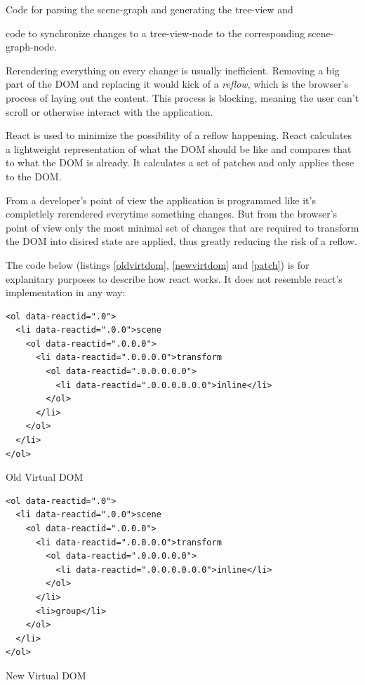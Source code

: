 \begin{enumerate*}
  \item Code for parsing the scene-graph and generating the tree-view and
  \item code to synchronize changes to a tree-view-node to the corresponding scene-graph-node.
\end{enumerate*}

Rerendering everything on every change is usually inefficient. Removing a big part
of the DOM and replacing it would kick of a \emph{reflow}, which is the browser's
process of laying out the content. This process is blocking, meaning the user can't
scroll or otherwise interact with the application. \cite{reflow}

React is used to minimize the possibility of a reflow happening. React
calculates a lightweight representation of what the DOM should be like and
compares that to what the DOM is already. It calculates a set of patches and
only applies these to the DOM.

From a developer's point of view the application is programmed like it's
completlely rerendered everytime something changes. But from the browser's point
of view only the most minimal set of changes that are required to transform the
DOM into disired state are applied, thus greatly reducing the risk of a reflow.

The code below (listings \ref{oldvirtdom}, \ref{newvirtdom} and \ref{patch}) is
for explanitary purposes to describe how react works. It does not resemble
react's implementation in any way:

\begin{listing}[H]
  \begin{verbatim}
<ol data-reactid=".0">
  <li data-reactid=".0.0">scene
    <ol data-reactid=".0.0.0">
      <li data-reactid=".0.0.0.0">transform
        <ol data-reactid=".0.0.0.0.0">
          <li data-reactid=".0.0.0.0.0.0">inline</li>
        </ol>
      </li>
    </ol>
  </li>
</ol>
  \end{verbatim}
  \caption{Old Virtual DOM}
  \label{oldvirtdom}
\end{listing}

\begin{listing}[H]
  \begin{verbatim}
<ol data-reactid=".0">
  <li data-reactid=".0.0">scene
    <ol data-reactid=".0.0.0">
      <li data-reactid=".0.0.0.0">transform
        <ol data-reactid=".0.0.0.0.0">
          <li data-reactid=".0.0.0.0.0.0">inline</li>
        </ol>
      </li>
      <li>group</li>
    </ol>
  </li>
</ol>
  \end{verbatim}
  \caption{New Virtual DOM}
  \label{newvirtdom}
\end{listing}


